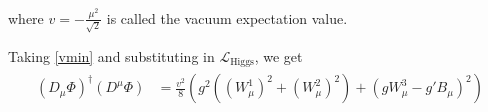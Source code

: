 where $v=-\frac{\mu^2}{\sqrt{2}}$ is called the vacuum expectation value.

Taking \ref{vmin} and substituting in $\mathcal{L}_\text{Higgs}$, we get 
\begin{align}\label{W}
\begin{split}
(D_\mu \Phi)^\dagger (D^\mu \Phi)& =\frac{v^2}{8} \left(g^2 ((W^1_\mu)^2 +(W^2_\mu)^2 )+( gW^3_\mu -g'B_\mu)^2 \right)
\end{split}
\end{align}

